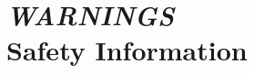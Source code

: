 \documentclass[twoside,12pt,openright,final,english]{memoir}
\newif\iftitle\titletrue
\newif\ifcopyright\copyrighttrue
\newif\ifwarnings\warningstrue %
\newif\ifsetup\setupfalse %
\newif\iffilament\filamentfalse %
\begin{document}
\frontmatter


\iftitle
{}
\fi

\ifcopyright
{}
\fi


\renewcommand{\cftchapterdotsep}{15}
\renewcommand{\cftdot}{\textperiodcentered}	%
\setlength{\cftbeforechapterskip}{5pt}  %
\tableofcontents*

\renewcommand*{\lofheadstart}{\vspace{1cm}}
\clearpage
\listoffigures*

\def\topblockvspace{0.11}


\ifwarnings
\chapter{\emph{WARNINGS}\protect \\
{Safety Information}}
\thispagestyle{empty}
{}
\fi

\mainmatter*


\ifsetup
\chapter{\emph{Setup Your Printer}}
\thispagestyle{empty}
\markboth{Setup Your Printer}{LulzBot\textsuperscript{\miniscule{\texttrademark}} TAZ User Manual}
{}
\fi

\iffilament
\chapter{\emph{Loading Filament}}
\thispagestyle{empty}
\markboth{Loading Filament}{LulzBot\textsuperscript{\miniscule{\texttrademark}} TAZ User Manual}
{}
\fi
\end{document}
